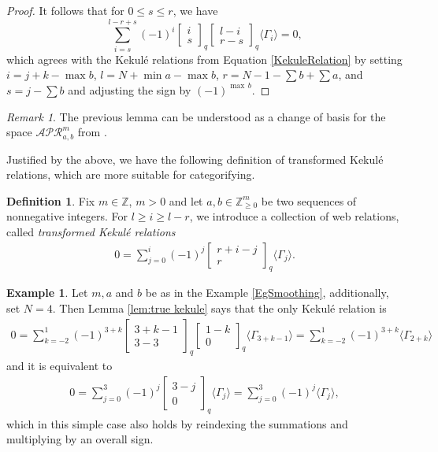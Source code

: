 \documentclass[12pt]{amsart}
\theoremstyle{definition}
\newtheorem{definition}[theorem]{Definition}
\newtheorem{example}[theorem]{Example}
\theoremstyle{remark}
\newtheorem{remark}[theorem]{Remark}
\numberwithin{equation}{section}
\numberwithin{figure}{section}
\newcommand{\Z}{\mathbb{Z}}
\begin{document}
\begin{proof}
  It follows that for $0\leq s\leq r$, we have
  \[\sum_{i=s}^{l-r+s}(-1)^{i}\begin{bmatrix}
    i\\s
  \end{bmatrix}_q\begin{bmatrix}
    l-i\\r-s
  \end{bmatrix}_q\langle\Gamma_i\rangle=0,\]
  which agrees with the Kekulé relations from Equation \eqref{KekuleRelation} by setting $i=j+k-\max b$, $l=N+\min a-\max b$, $r=N-1-\sum b+\sum a$, and $s=j-\sum b$ and adjusting the sign by $(-1)^{\max \, b}$. 
\end{proof}

\begin{remark}
    The previous lemma can be understood as a change of basis for the space $\mathcal{APR}_{a,b}^m$ from \cite[Theorem 5.3.2.]{Mor2007}.
\end{remark}

Justified by the above, we have the following definition of transformed Kekulé relations, which are more suitable for categorifying.
\begin{definition}\label{def:true kekule}
    Fix $m \in \Z$, $m > 0$ and let $a,b \in \Z_{\geq 0}^m$ be two sequences of nonnegative integers. For $l \geq i \geq l - r$, we introduce a collection of web relations, called \emph{transformed Kekulé relations}
\begin{align}\label{eq:true kekuleTwo}
    0 = \sum_{j=0}^{i}(-1)^j\begin{bmatrix}
    r+i-j\\
    r
  \end{bmatrix}_q\langle\Gamma_j\rangle.
\end{align}
\end{definition}

\begin{example}
    Let $m,a$ and $b$ be as in the Example \ref{EgSmoothing}, additionally, set $N = 4$. Then Lemma \ref{lem:true kekule} says that the only Kekulé relation is
    \begin{align*}
          0 = \sum_{k=-2}^{1}(-1)^{3+k}
  \begin{bmatrix}
    3+k-1\\
    3-3
  \end{bmatrix}_q
  \begin{bmatrix}
    1-k\\
    0
  \end{bmatrix}_q \langle\Gamma_{3+k-1}\rangle = \sum_{k=-2}^{1}(-1)^{3+k}\langle\Gamma_{2+k}\rangle 
    \end{align*}
     and it is equivalent to
    \begin{align*}
    0 = \sum_{j=0}^{3}(-1)^j\begin{bmatrix}
    3-j\\
    0
  \end{bmatrix}_q\langle\Gamma_j\rangle = \sum_{j=0}^{3}(-1)^j\langle\Gamma_j\rangle,
\end{align*}
which in this simple case also holds by reindexing the summations and multiplying by an overall sign.
\end{example}
\end{document}
